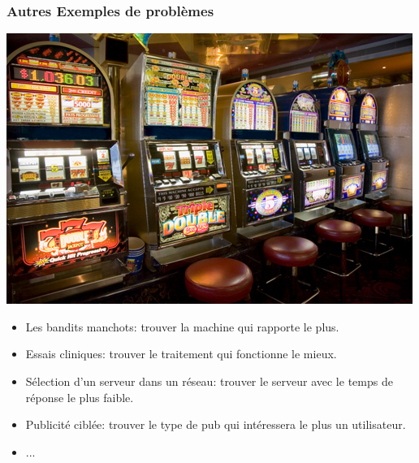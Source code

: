 \documentclass{beamer}
\begin{document}
\begin{frame}
    \frametitle{Autres Exemples de problèmes}
    \begin{center}
        \includegraphics[scale=0.8]{bandit_casino.jpg}
    \end{center}
    \begin{itemize}
        \item Les bandits manchots: trouver la machine qui rapporte le plus.
        \item Essais cliniques: trouver le traitement qui fonctionne le mieux.
        \item Sélection d'un serveur dans un réseau: trouver le serveur avec le temps de réponse le plus faible.
        \item Publicité ciblée: trouver le type de pub qui intéressera le plus un utilisateur.
        \item ...
    \end{itemize}
\end{frame}
\end{document}
